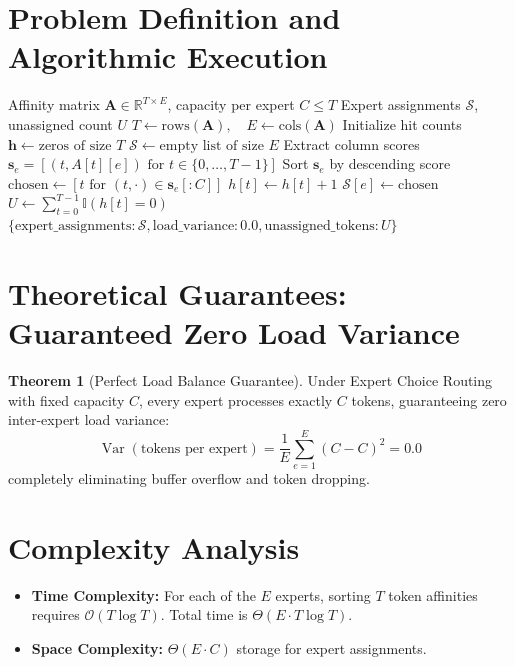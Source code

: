 \documentclass[11pt,a4paper]{article}
\theoremstyle{definition}
\newtheorem{theorem}{Theorem}[section]
\begin{document}
\section{Problem Definition and Algorithmic Execution}

\begin{algorithm}[H]
\caption{Expert Choice Routing Forward Pass}
\label{alg:expert_choice}
\begin{algorithmic}[1]
\Require Affinity matrix $\mathbf{A} \in \mathbb{R}^{T \times E}$, capacity per expert $C \le T$
\Ensure Expert assignments $\boldsymbol{\mathcal{S}}$, unassigned count $U$
\State $T \gets \text{rows}(\mathbf{A}), \quad E \gets \text{cols}(\mathbf{A})$
\State Initialize hit counts $\mathbf{h} \gets \text{zeros of size } T$
\State $\boldsymbol{\mathcal{S}} \gets \text{empty list of size } E$
    \State Extract column scores $\mathbf{s}_e = [(t, A[t][e]) \text{ for } t \in \{0, \dots, T-1\}]$
    \State Sort $\mathbf{s}_e$ by descending score
    \State $\text{chosen} \gets [t \text{ for } (t, \cdot) \in \mathbf{s}_e[:C]]$
        \State $h[t] \gets h[t] + 1$
    \EndFor
    \State $\mathcal{S}[e] \gets \text{chosen}$
\EndFor
\State $U \gets \sum_{t=0}^{T-1} \mathbb{I}(h[t] = 0)$
\State \Return $\{\text{expert\_assignments}: \boldsymbol{\mathcal{S}}, \text{load\_variance}: 0.0, \text{unassigned\_tokens}: U\}$
\end{algorithmic}
\end{algorithm}

\section{Theoretical Guarantees: Guaranteed Zero Load Variance}

\begin{theorem}[Perfect Load Balance Guarantee]
Under Expert Choice Routing with fixed capacity $C$, every expert processes exactly $C$ tokens, guaranteeing zero inter-expert load variance:
\begin{equation}
\operatorname{Var}(\text{tokens per expert}) = \frac{1}{E} \sum_{e=1}^E (C - C)^2 = 0.0
\end{equation}
completely eliminating buffer overflow and token dropping.
\end{theorem}

\section{Complexity Analysis}
\begin{itemize}
    \item \textbf{Time Complexity:} For each of the $E$ experts, sorting $T$ token affinities requires $\mathcal{O}(T \log T)$. Total time is $\Theta(E \cdot T \log T)$.
    \item \textbf{Space Complexity:} $\Theta(E \cdot C)$ storage for expert assignments.
\end{itemize}
\end{document}
